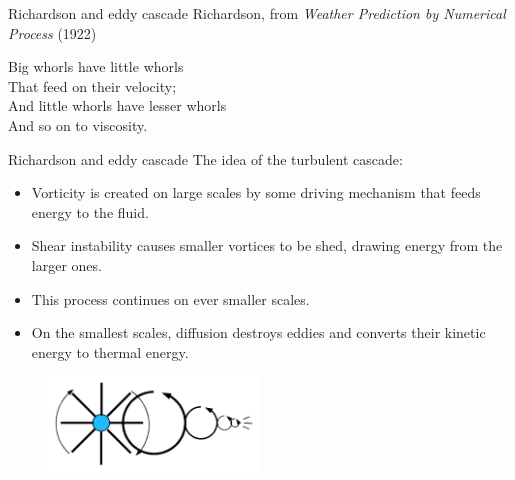 
\begin{frame}{Richardson and eddy cascade}
	Richardson, from \emph{Weather Prediction by Numerical Process} (1922)
	\begin{fancyquotes}
		Big whorls have little whorls\\
		That feed on their velocity;\\
		And little whorls have lesser whorls\\
		And so on to viscosity.
	\end{fancyquotes}
\end{frame}


\begin{frame}{Richardson and eddy cascade}
	The idea of the turbulent cascade:
	\begin{itemize}
		\item Vorticity is created on large scales by some driving mechanism that feeds energy to the fluid.
		\item Shear instability causes smaller vortices to be shed, drawing energy from the larger ones.
		\item This process continues on ever smaller scales.
		\item On the smallest scales, diffusion destroys eddies and converts their kinetic energy to thermal energy.
	\end{itemize}
	
	\begin{figure}
		\includegraphics[width=0.5\textwidth]{scales3}
	\end{figure}
\end{frame}


